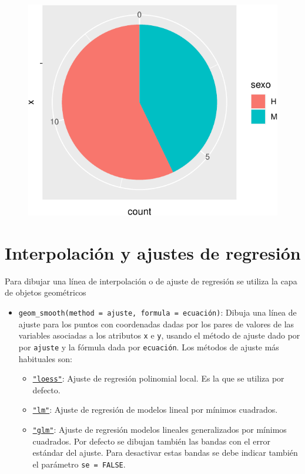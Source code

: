 \documentclass[
  a4paper,
]{scrreport}
\providecommand{\tightlist}{%
  \setlength{\itemsep}{0pt}\setlength{\parskip}{0pt}}\usepackage{longtable,booktabs,array}
\theoremstyle{definition}
\theoremstyle{definition}
\theoremstyle{remark}
\begin{document}
\begin{figure}[H]

{\centering \includegraphics{./07-graficos_files/figure-pdf/unnamed-chunk-23-1.pdf}

}

\end{figure}

\hypertarget{interpolaciuxf3n-y-ajustes-de-regresiuxf3n}{%
\section{Interpolación y ajustes de
regresión}\label{interpolaciuxf3n-y-ajustes-de-regresiuxf3n}}

Para dibujar una línea de interpolación o de ajuste de regresión se
utiliza la capa de objetos geométricos

\begin{itemize}
\tightlist
\item
  \texttt{geom\_smooth(method\ =\ ajuste,\ formula\ =\ ecuación)}:
  Dibuja una línea de ajuste para los puntos con coordenadas dadas por
  los pares de valores de las variables asociadas a los atributos
  \texttt{x} e \texttt{y}, usando el método de ajuste dado por por
  \texttt{ajuste} y la fórmula dada por \texttt{ecuación}. Los métodos
  de ajuste más habituales son:

  \begin{itemize}
  \tightlist
  \item
    \href{https://rdrr.io/r/stats/loess.html}{\texttt{"loess"}}: Ajuste
    de regresión polinomial local. Es la que se utiliza por defecto.
  \item
    \href{https://rdrr.io/r/stats/lm.html}{\texttt{"lm"}}: Ajuste de
    regresión de modelos lineal por mínimos cuadrados.
  \item
    \href{https://rdrr.io/r/stats/glm.html}{\texttt{"glm"}}: Ajuste de
    regresión modelos lineales generalizados por mínimos cuadrados. Por
    defecto se dibujan también las bandas con el error estándar del
    ajuste. Para desactivar estas bandas se debe indicar también el
    parámetro \texttt{se\ =\ FALSE}.
  \end{itemize}
\end{itemize}
\end{document}
